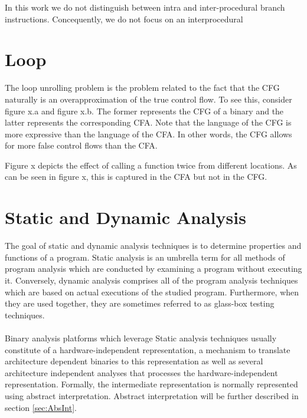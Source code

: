 \documentclass{kththesis}
\begin{document}
In this work we do not distinguish between intra and inter-procedural branch instructions. Concequently, we do not focus on an interprocedural


\section{Loop}
The loop unrolling problem is the problem related to the fact that the CFG naturally is an overapproximation of the true control flow. To see this, consider figure x.a and figure x.b. The former represents the CFG of a binary and the latter represents the corresponding CFA. Note that the language of the CFG is more expressive than the language of the CFA. In other words, the CFG allows for more false control flows than the CFA.

Figure x depicts the effect of calling a function twice from different locations. As can be seen in figure x, this is captured in the CFA but not in the CFG.




\section{Static and Dynamic Analysis}
The goal of static and dynamic analysis techniques is to determine properties and
functions of a program\cite{staticOfInd}. Static analysis is an umbrella term for all methods of program analysis which are conducted by examining a program without executing it. Conversely, dynamic analysis comprises all of the program analysis techniques which are based on actual executions of the studied program. Furthermore, when they are used together, they are sometimes referred to as glass-box testing techniques\cite{DefinitionStaticAnal}.
\\ \\
Binary analysis platforms which leverage Static analysis techniques usually constitute of a hardware-independent representation, a mechanism to translate architecture dependent binaries to this representation as well as several architecture independent analyses that processes the hardware-independent representation\cite{TrABin}. Formally, the intermediate representation is normally represented using abstract interpretation\cite{Jakstab}. Abstract interpretation will be further described in section \ref{sec:AbsInt}.
\end{document}
